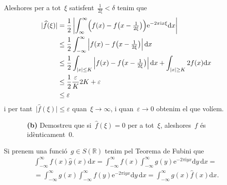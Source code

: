 \documentclass[a4paper]{article}
\theoremstyle{definition}
\newcommand{\iu}{\mathrm{i}}
\newcommand{\e}{\mathrm{e}}
\newcommand{\uppi}{\pi}
\newcommand{\diff}{\mathrm{d}}
\newcommand{\abs}[1]{\lvert{#1}\rvert}
\newcommand{\Abs}[1]{\left\lvert{#1}\right\rvert}
\begin{document}
Aleshores per a tot~\(\xi\) satisfent~\(\frac{1}{2\xi}<\delta\) tenim que
\begin{align*}
    \abs{\widehat{f}(\xi)} &= \frac{1}{2} \Abs{\int_{\infty}^{\infty}
                              \Bigl(
                                  f(x) - f\bigl(
                                      x - {\textstyle\frac{1}{2\xi}}
                                  \bigr)
                              \Bigr)
                              \e^{-2\uppi\iu x\xi}
                              \diff x} \\
                           &\leq \frac{1}{2} \int_{-\infty}^{\infty}
                              \Abs{f(x) - f\bigl(
                                      x - {\textstyle\frac{1}{2\xi}}
                              \bigr)}
                              \diff x \\
                           &\leq \frac{1}{2} \int_{\abs{x}\leq K}
                              \Abs{f(x) - f\bigl(
                                      x - {\textstyle\frac{1}{2\xi}}
                              \bigr)}
                              \diff x
                              +
                              \int_{\abs{x}\geq K}
                              2f(x)
                              \diff x \\
                           &\leq \frac{1}{2}
                              \frac{\varepsilon}{K}2K
                              +\varepsilon \\
                           &\leq \varepsilon
\end{align*}
i per tant~\(\abs{\widehat{f}(\xi)} \leq \varepsilon\) quan~\(\xi\to\infty\), i
quan~\(\varepsilon\to0\) obtenim el que volíem.

\begin{enumerate}
    \item[]\begin{enumerate}
        \item[\textbf{(b)}] Demostreu que si~\(\widehat{f}(\xi) = 0\) per a
            tot~\(\xi\), aleshores~\(f\) és idènticament~\(0\).
    \end{enumerate}
\end{enumerate}

Si prenem una funció~\(g\in S(\mathbb{R})\) tenim pel Teorema de Fubini que
\begin{multline*}
    \int_{-\infty}^{\infty} f(x)\widehat{g}(x) \diff x
    = \int_{-\infty}^{\infty} f(x)
    \int_{-\infty}^{\infty} g(y) \e^{-2\uppi\iu yx} \diff y\, \diff x = \\
    = \int_{-\infty}^{\infty} g(x)
    \int_{-\infty}^{\infty} f(y) \e^{-2\uppi\iu yx} \diff y\, \diff x
    = \int_{-\infty}^{\infty} g(x)\widehat{f}(x) \diff x.
\end{multline*}
\end{document}
